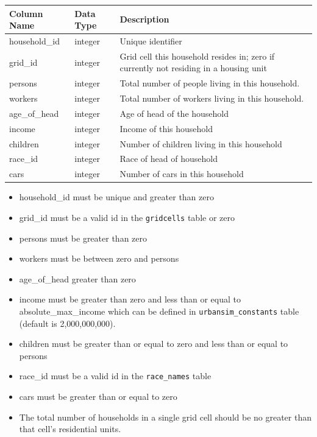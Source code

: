 \begin{tabular}{lll}
\textbf{Column Name} & \textbf{Data Type} & \textbf{Description} \\
\hline
household_id & integer & Unique identifier  \\
\hline
grid_id & integer & Grid cell this household resides in; zero if currently not residing in a housing unit  \\
\hline
persons & integer & Total number of people living in this household.  \\
\hline
workers & integer & Total number of workers living in this household.  \\
\hline
age_of_head & integer & Age of head of the household  \\
\hline
income & integer & Income of this household  \\
\hline
children & integer & Number of children living in this household  \\
\hline
race_id & integer & Race of head of household  \\
\hline
cars & integer & Number of cars in this household  \\
\hline

\end{tabular}

\begin{itemize} \tight
\item household_id must be unique and greater than zero
\item grid_id must be a valid id in the \verb|gridcells| table or zero
\item persons must be greater than zero
\item workers must be between zero and persons
\item age_of_head greater than zero
\item income must be greater than zero and less than or equal to
absolute_max_income which can be defined in \verb|urbansim_constants| table (default is 2,000,000,000).
\item children must be greater than or equal to zero and less than or equal to
persons
\item race_id must be a valid id in the \verb|race_names| table
\item cars must be greater than or equal to zero
\item The total number of households in a single grid cell should be no greater
than that cell's residential units.

\end{itemize}

